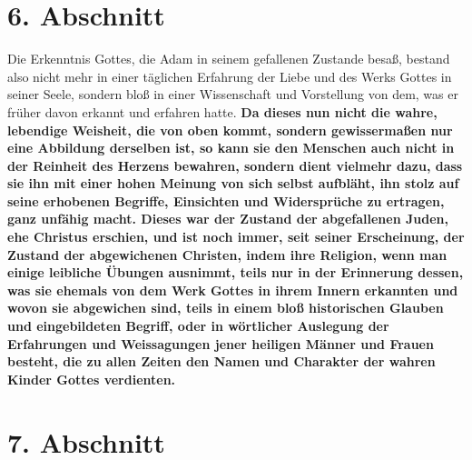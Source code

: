 \section{6. Abschnitt} \label{kap7_ab6}

Die Erkenntnis Gottes, die Adam in seinem gefallenen Zustande besaß, bestand
also nicht mehr in einer täglichen Erfahrung der Liebe und des Werks Gottes in
seiner Seele, sondern bloß in einer Wissenschaft
und Vorstellung von dem, was er
früher davon erkannt und erfahren hatte. \textbf{Da dieses nun nicht die wahre,
lebendige Weisheit, die von oben
kommt, sondern gewissermaßen nur eine Abbildung
derselben ist, so kann sie den Menschen auch nicht in der Reinheit des Herzens
bewahren, sondern dient vielmehr dazu, dass sie ihn mit einer hohen Meinung von
sich selbst aufbläht, ihn stolz auf seine erhobenen Begriffe,
Einsichten und Widersprüche zu ertragen, ganz
unfähig macht. Dieses war der Zustand der
abgefallenen Juden, ehe Christus erschien,
und ist noch immer, seit seiner
Erscheinung, der Zustand der abgewichenen
Christen, indem ihre Religion, wenn
man einige leibliche Übungen ausnimmt, teils nur in der Erinnerung dessen, was
sie ehemals von dem Werk Gottes in ihrem Innern erkannten und wovon sie
abgewichen sind, teils in einem bloß historischen Glauben und eingebildeten
Begriff, oder in wörtlicher Auslegung
 der Erfahrungen und Weissagungen jener
heiligen Männer und Frauen besteht, die zu allen Zeiten den Namen und Charakter
der wahren Kinder Gottes verdienten.}

\section{7. Abschnitt} \label{kap7_ab7}

